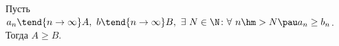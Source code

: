 \label{pernesp}
Пусть $a_n\tend{n\to\infty}A,\ b\tend{n\to\infty}B,\ \exists\  N\in\N\colon \forall\  n\hm>N \pau a_n\geq b_n$. Тогда $A\geq B$.
